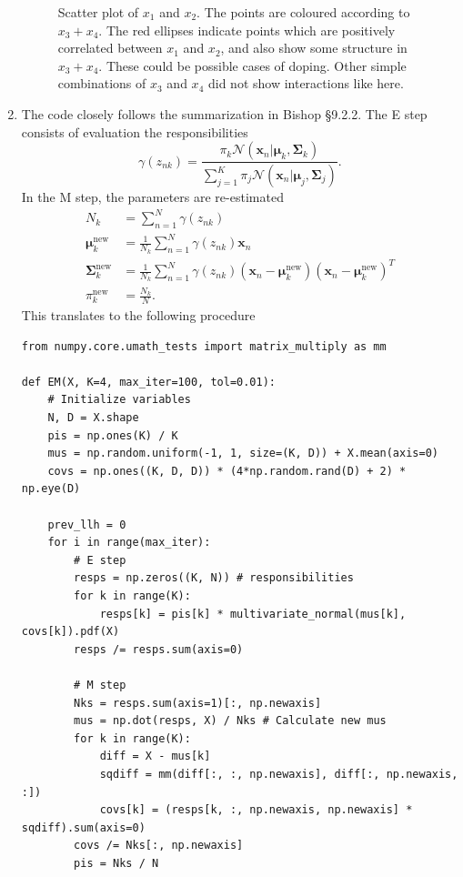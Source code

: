 \documentclass[a4paper]{article}
\begin{document}
\begin{enumerate}
\begin{figure}[H]
\caption{Scatter plot of $x_1$ and $x_2$. The points are coloured according to $x_3 + x_4$. The red ellipses indicate points which are positively correlated between $x_1$ and $x_2$, and also show some structure in $x_3 + x_4$. These could be possible cases of doping. Other simple combinations of $x_3$ and $x_4$ did not show interactions like here.}
\label{fig:scatter}
\end{figure}
\item 
The code closely follows the summarization in Bishop \S9.2.2. The E step consists of evaluation the responsibilities
\begin{equation}
\gamma(z_{nk}) = \frac{\pi_k\mathcal{N}(\bm{x}_n|\bm{\mu}_k,\bm{\Sigma}_k)}{\sum_{j=1}^K\pi_j\mathcal{N}(\bm{x}_n|\bm{\mu}_j,\bm{\Sigma}_j)}.
\end{equation}
In the M step, the parameters are re-estimated
\begin{align}
N_k &= \sum_{n=1}^N\gamma(z_{nk}) \\
\bm{\mu}_k^{\text{new}}&=\frac{1}{N_k}\sum_{n=1}^N\gamma(z_{nk})\bm{x}_n\\
\bm{\Sigma}_k^{\text{new}} &= \frac{1}{N_k}\sum_{n=1}^N\gamma(z_{nk})(\bm{x}_n - \bm{\mu}_k^{\text{new}})(\bm{x}_n - \bm{\mu}_k^{\text{new}})^T \\
\pi_k^{\text{new}} &= \frac{N_k}{N}.
\end{align}
This translates to the following procedure
\begin{lstlisting}
from numpy.core.umath_tests import matrix_multiply as mm

def EM(X, K=4, max_iter=100, tol=0.01):
    # Initialize variables
    N, D = X.shape
    pis = np.ones(K) / K
    mus = np.random.uniform(-1, 1, size=(K, D)) + X.mean(axis=0)
    covs = np.ones((K, D, D)) * (4*np.random.rand(D) + 2) * np.eye(D)
    
    prev_llh = 0
    for i in range(max_iter):
        # E step
        resps = np.zeros((K, N)) # responsibilities
        for k in range(K):
            resps[k] = pis[k] * multivariate_normal(mus[k], covs[k]).pdf(X)
        resps /= resps.sum(axis=0)
        
        # M step
        Nks = resps.sum(axis=1)[:, np.newaxis]
        mus = np.dot(resps, X) / Nks # Calculate new mus
        for k in range(K):
            diff = X - mus[k]
            sqdiff = mm(diff[:, :, np.newaxis], diff[:, np.newaxis, :])
            covs[k] = (resps[k, :, np.newaxis, np.newaxis] * sqdiff).sum(axis=0)
        covs /= Nks[:, np.newaxis]
        pis = Nks / N
        

\end{lstlisting}
\end{enumerate}
\end{document}

